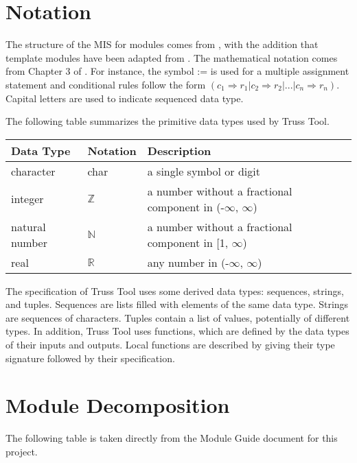 \documentclass[12pt, titlepage]{article}
\begin{document}
\section{Notation}



The structure of the MIS for modules comes from \citet{HoffmanAndStrooper1995},
with the addition that template modules have been adapted from
\cite{GhezziEtAl2003}.  The mathematical notation comes from Chapter 3 of
\citet{HoffmanAndStrooper1995}.  For instance, the symbol := is used for a
multiple assignment statement and conditional rules follow the form $(c_1
\Rightarrow r_1 | c_2 \Rightarrow r_2 | ... | c_n \Rightarrow r_n )$.
Capital letters are used to indicate sequenced data type. 

The following table summarizes the primitive data types used by Truss Tool. 

\begin{center}
\renewcommand{\arraystretch}{1.2}
\noindent 
\begin{tabular}{l l p{7.5cm}} 
\toprule 
\textbf{Data Type} & \textbf{Notation} & \textbf{Description}\\ 
\midrule
character & char & a single symbol or digit\\
integer & $\mathbb{Z}$ & a number without a fractional component in (-$\infty$, $\infty$) \\
natural number & $\mathbb{N}$ & a number without a fractional component in [1, $\infty$) \\
real & $\mathbb{R}$ & any number in (-$\infty$, $\infty$)\\
\bottomrule
\end{tabular} 
\end{center}

\noindent
The specification of  Truss Tool uses some derived data types: sequences, strings, and
tuples. Sequences are lists filled with elements of the same data type. Strings
are sequences of characters. Tuples contain a list of values, potentially of
different types. In addition, Truss Tool uses functions, which
are defined by the data types of their inputs and outputs. Local functions are
described by giving their type signature followed by their specification.

\section{Module Decomposition}

The following table is taken directly from the Module Guide document for this project.
\end{document}
